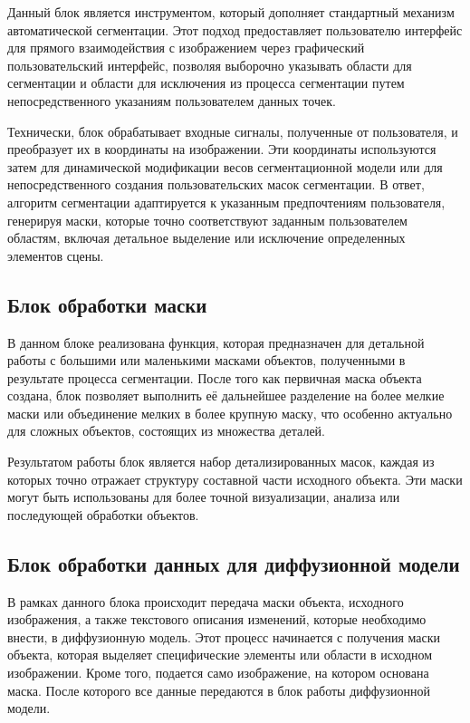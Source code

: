 Данный блок является инструментом, который дополняет стандартный механизм автоматической сегментации. Этот подход предоставляет пользователю интерфейс для прямого взаимодействия с изображением через графический пользовательский интерфейс, позволяя выборочно указывать области для сегментации и области для исключения из процесса сегментации путем непосредственного указаниям пользователем данных точек.

Технически, блок обрабатывает входные сигналы, полученные от пользователя, и преобразует их в координаты на изображении. Эти координаты используются затем для динамической модификации весов сегментационной модели или для непосредственного создания пользовательских масок сегментации. В ответ, алгоритм сегментации адаптируется к указанным предпочтениям пользователя, генерируя маски, которые точно соответствуют заданным пользователем областям, включая детальное выделение или исключение определенных элементов сцены.

\subsection{Блок обработки маски}

В данном блоке реализована функция, которая предназначен для детальной работы с большими или маленькими масками объектов, полученными в результате процесса сегментации. После того как первичная маска объекта создана, блок позволяет выполнить её дальнейшее разделение на более мелкие маски или объединение мелких в более крупную маску, что особенно актуально для сложных объектов, состоящих из множества деталей.

Результатом работы блок является набор детализированных масок, каждая из которых точно отражает структуру составной части исходного объекта. Эти маски могут быть использованы для более точной визуализации, анализа или последующей обработки объектов. 

\subsection{Блок обработки данных для диффузионной модели}

В рамках данного блока происходит передача маски объекта, исходного изображения, а также текстового описания изменений, которые необходимо внести, в диффузионную модель. Этот процесс начинается с получения маски объекта, которая выделяет специфические элементы или области в исходном изображении. Кроме того, подается само изображение, на котором основана маска. После которого все данные передаются в блок работы диффузионной модели.

